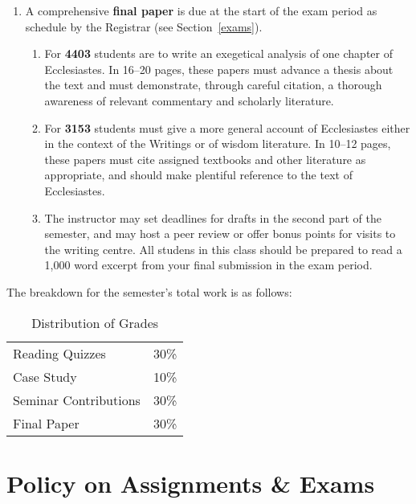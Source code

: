 \documentclass[titlepage]{article}
\newcommand\policy{../policy}
\begin{document}
\begin{enumerate}
	\item A comprehensive \textbf{final paper} is due at the start of
	the exam period as schedule by the Registrar (see
	Section~\ref{exams}).

	\begin{enumerate}

		\item For \textbf{4403} students are to write an exegetical
		analysis of one chapter of Ecclesiastes. In 16--20 pages, these
		papers must advance a thesis about the text and must
		demonstrate, through careful citation, a thorough awareness of
		relevant commentary and scholarly literature.

		\item For \textbf{3153} students must give a more general
		account of Ecclesiastes either in the context of the Writings or
		of wisdom literature. In 10--12 pages, these papers must cite
		assigned textbooks and other literature as appropriate, and
		should make plentiful reference to the text of Ecclesiastes.

		\item The instructor may set deadlines for drafts in the second
		part of the semester, and may host a peer review or offer bonus
		points for visits to the writing centre. All studens in this
		class should be prepared to read a 1,000 word excerpt from your
		final submission in the exam period.

	\end{enumerate}

\end{enumerate}

The breakdown for the semester's total work is as follows:

\begin{table}[htbp]
  \centering
  {\lining
  \begin{tabular}{lr}
    \toprule
    Reading Quizzes        & 30\% \\
    Case Study             & 10\% \\
    Seminar Contributions  & 30\% \\
    Final Paper            & 30\% \\
    \bottomrule
  \end{tabular}}
  \caption{Distribution of Grades}
  \label{distribution}
\end{table}



\section{Policy on Assignments \& Exams}
\label{policy}
\end{document}
